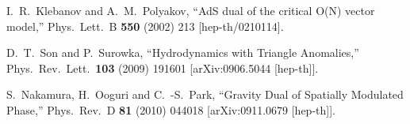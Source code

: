 \begin{thebibliography}{99}
  I.~R.~Klebanov and A.~M.~Polyakov,
  ``AdS dual of the critical O(N) vector model,''
  Phys.\ Lett.\ B {\bf 550} (2002) 213
  [hep-th/0210114].



  D.~T.~Son and P.~Surowka,
  ``Hydrodynamics with Triangle Anomalies,''
  Phys.\ Rev.\ Lett.\  {\bf 103} (2009) 191601
  [arXiv:0906.5044 [hep-th]].
  
  S.~Nakamura, H.~Ooguri and C.~-S.~Park,
  ``Gravity Dual of Spatially Modulated Phase,''
  Phys.\ Rev.\ D {\bf 81} (2010) 044018
  [arXiv:0911.0679 [hep-th]].

\end{thebibliography}